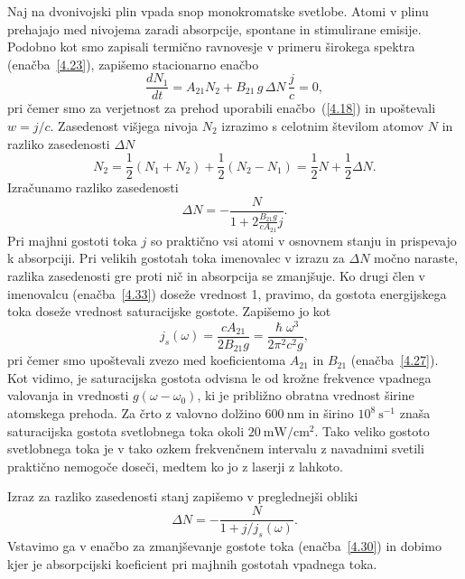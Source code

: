 Naj na dvonivojski plin vpada snop monokromatske svetlobe. 
Atomi v plinu prehajajo med nivojema zaradi absorpcije, spontane in stimulirane emisije. 
Podobno kot smo zapisali termično ravnovesje v primeru
širokega spektra (enačba~\ref{4.23}), zapišemo stacionarno enačbo 
\begin{equation}
\frac{dN_{1}}{dt}=A_{21}N_{2}+B_{21}\,g\,\Delta N\,\frac{j}{c}=0,
\label{4.32}
\end{equation}
pri čemer smo za verjetnost za prehod uporabili
enačbo~(\ref{4.18}) in upoštevali $w=j/c$. Zasedenost višjega nivoja $N_{2}$ izrazimo s 
celotnim številom atomov $N$ in razliko zasedenosti $\Delta N$
\begin{equation}
N_{2}=\frac{1}{2}(N_1+N_2) + \frac{1}{2}(N_2-N_1) = \frac{1}{2}N+\frac{1}{2}\Delta N.
\label{4.321}
\end{equation}
Izračunamo razliko zasedenosti 
\begin{equation}
\Delta N=-\frac{N}{1+2\frac{B_{21}g}{cA_{21}}j}.
\label{4.33}
\end{equation}
Pri majhni gostoti toka $j$ so praktično vsi atomi v osnovnem stanju in prispevajo
k absorpciji. Pri velikih gostotah toka  imenovalec v izrazu za $\Delta N$
močno naraste, razlika zasedenosti gre proti nič in absorpcija se zmanjšuje.
Ko drugi člen v imenovalcu (enačba~\ref{4.33}) doseže vrednost 1, pravimo, da
gostota energijskega toka doseže vrednost saturacijske gostote.
Zapišemo jo kot 
\begin{equation}
j_{s}(\omega)=\frac{cA_{21}}{2B_{21}g}=
\frac{\hslash\omega^{3}}{2\pi^{2}c^{2}g},
\label{4.34}
\end{equation}
pri čemer smo upoštevali zvezo med koeficientoma $A_{21}$ in $B_{21}$
(enačba~\ref{4.27}).
Kot vidimo, je saturacijska gostota odvisna le od krožne frekvence vpadnega valovanja 
in vrednosti $g(\omega - \omega_0)$, ki je približno obratna vrednost širine atomskega 
prehoda. Za črto z valovno dolžino $600~\si{\nano\metre}$ 
in širino $10^{8}~\si{\second}^{-1}$ znaša saturacijska gostota svetlobnega toka okoli 
$20~\si{\milli\watt/\centi\metre^2}$. Tako veliko gostoto svetlobnega toka je v tako ozkem
frekvenčnem intervalu z navadnimi svetili praktično nemogoče doseči, 
medtem ko jo z laserji z lahkoto.

Izraz za razliko zasedenosti stanj zapišemo v preglednejši obliki
\begin{equation}
\Delta N=-\frac{N}{1+j/j_{s}(\omega)}.
\label{4.35}
\end{equation}
Vstavimo ga v enačbo za zmanjševanje gostote toka (enačba~\ref{4.30}) in dobimo
kjer je 
absorpcijski koeficient pri majhnih gostotah vpadnega toka.

